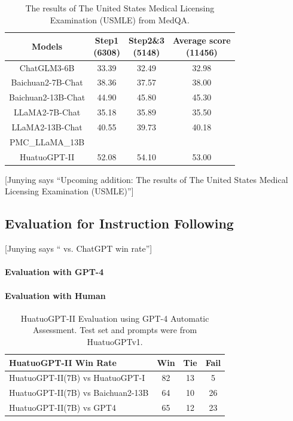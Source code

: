 \documentclass{article} %
\newcommand{\junying}[1]{{ \color{teal} [Junying says ``#1'']}}
\begin{document}
\begin{table}[h]
\centering
\begin{tabular}{|c|c|c|c|}
\hline
Models &  \makecell{Step1 \\ (6308)}  & \makecell{Step2\&3 \\ (5148)}  &  \makecell{Average score \\ (11456)} \\ \hline
ChatGLM3-6B  & 33.39 & 32.49 & 32.98 \\
Baichuan2-7B-Chat       & 38.36        & 37.57           & 38.00                 \\ 
Baichuan2-13B-Chat      & 44.90        & 45.80           & 45.30                 \\ 
LLaMA2-7B-Chat & 35.18 & 35.89 & 35.50 \\
LLaMA2-13B-Chat& 40.55 & 39.73 & 40.18 \\
PMC\_LLaMA\_13B \\ \hline
HuatuoGPT-II            & 52.08        & 54.10           & 53.00                 \\ \hline
\end{tabular}
\caption{The results of The United States Medical Licensing Examination (USMLE) from MedQA.}
\end{table}


\junying{Upcoming addition: The results of The United States Medical Licensing Examination (USMLE)}


\subsection{Evaluation for Instruction Following}
    \junying{ vs. ChatGPT win rate}
    \paragraph{Evaluation with GPT-4}

    \paragraph{Evaluation with Human}


\begin{table}[ht]
    \centering
    \caption{HuatuoGPT-II Evaluation using GPT-4 Automatic Assessment. Test set and prompts were from HuatuoGPTv1.}
    \label{HuatuoGPTComparison}
    \begin{tabular}{|l|c|c|c|}
    \hline
    \textbf{HuatuoGPT-II Win Rate}             & \textbf{Win} & \textbf{Tie} & \textbf{Fail} \\
    \hline
    HuatuoGPT-II(7B) vs HuatuoGPT-I   & 82  & 13  & 5    \\
    \hline
    HuatuoGPT-II(7B) vs Baichuan2-13B & 64  & 10  & 26   \\
    \hline
    HuatuoGPT-II(7B) vs GPT4          & 65  & 12  & 23   \\
    \hline
    \end{tabular}
    \end{table}
\end{document}

